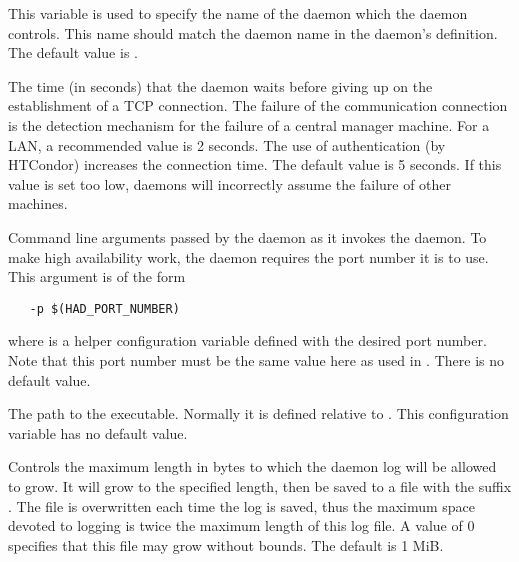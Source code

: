 \begin{description}
\label{param:HADControllee}
\item[\Macro{HAD\_CONTROLLEE}]
  This variable is used to specify the name of the daemon which the
   daemon controls.   This name should match the daemon
  name in the  daemon's  definition.  
  The default value is .

\label{param:HADConnectionTimeout}
\item[\Macro{HAD\_CONNECTION\_TIMEOUT}]
  The time (in seconds) that the  daemon waits before giving
  up on the establishment of a TCP connection.
  The failure of the communication connection
  is the detection mechanism for the failure of a central
  manager machine.
  For a LAN, a recommended value is 2 seconds.
  The use of authentication (by HTCondor) increases the connection
  time.
  The default value is 5 seconds.
  If this value is set too low,
   daemons will incorrectly assume
  the failure of other machines.

\label{param:HADArgs}
\item[\Macro{HAD\_ARGS}]
  Command line arguments passed by the  daemon
  as it invokes the  daemon.
  To make high availability work, the  daemon
  requires the port number it is to use.
  This argument is of the form
  \begin{verbatim}
   -p $(HAD_PORT_NUMBER)
  \end{verbatim}
  where  is a helper configuration variable
  defined with the desired port number.
  Note that this port number must be the same value here as
  used in .
  There is no default value.


\label{param:HAD}
\item[\Macro{HAD}]
  The path to the  executable. Normally it is defined
  relative to .
  This configuration variable has no default value.

\label{param:MaxHADLog}
\item[\Macro{MAX\_HAD\_LOG}]
  Controls the maximum length in bytes to which the 
  daemon log will be allowed to grow. It will grow to the specified length,
  then be saved to a file with the suffix . 
  The   file is overwritten each time the log is saved,
  thus the maximum space devoted to logging is twice the maximum length
  of this log file.
  A value of 0 specifies that this file may grow without bounds.
  The default is 1 MiB.


\end{description}
